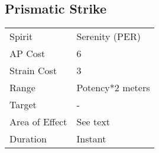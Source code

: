 \documentclass[11pt,a4paper,twocolumn]{book}
\begin{document}
%	
%
%
%

\subsection*{Prismatic Strike}
{
	\begin{tabu} to 75mm{| X[l,4] | X[l,7] |}
		\hline
		Spirit         & Serenity (PER)   \\
		AP Cost        & 6                \\
		Strain Cost    & 3                \\
		Range          & Potency*2 meters \\
		Target         & -                \\
		Area of Effect & See text         \\
		Duration       & Instant          \\ \hline
	\end{tabu}
	
}
\end{document}
